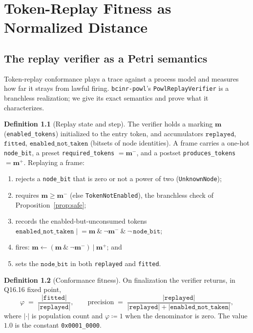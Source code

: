 \documentclass[11pt,oneside]{book}
\theoremstyle{definition}
\newtheorem{definition}{Definition}[chapter]
\theoremstyle{plain}
\theoremstyle{remark}
\newcommand{\Fitness}{\varphi}
\newcommand{\code}[1]{\texttt{#1}}
\begin{document}
\chapter{Token-Replay Fitness as Normalized Distance}
\label{ch:fitness}

\section{The replay verifier as a Petri semantics}

Token-replay conformance \cite{rozinat2008} plays a trace against a process model and measures
how far it strays from lawful firing. \code{bcinr-powl}'s \code{PowlReplayVerifier} is a
branchless realization; we give its exact semantics and prove what it characterizes.

\begin{definition}[Replay state and step]\label{def:replay}
The verifier holds a marking $\bm m$ (\code{enabled\_tokens}) initialized to the entry token,
and accumulators $\code{replayed}$, $\code{fitted}$, $\code{enabled\_not\_taken}$ (bitsets of
node identities). A frame carries a one-hot \code{node\_bit}, a preset \code{required\_tokens}
$=\bm m^{-}$, and a postset \code{produces\_tokens} $=\bm m^{+}$. Replaying a frame:
\begin{enumerate}[label=(\arabic*),leftmargin=*]
\item rejects a \code{node\_bit} that is zero or not a power of two (\code{UnknownNode});
\item requires $\bm m\ge\bm m^{-}$ (else \code{TokenNotEnabled}), the branchless check of
      Proposition~\ref{prop:safe};
\item records the enabled-but-unconsumed tokens
      $\code{enabled\_not\_taken}\mathrel{|}= \bm m\ \&\ \lnot\bm m^{-}\ \&\ \lnot\,\code{node\_bit}$;
\item fires: $\bm m\gets(\bm m\ \&\ \lnot\bm m^{-})\ |\ \bm m^{+}$; and
\item sets the $\code{node\_bit}$ in both \code{replayed} and \code{fitted}.
\end{enumerate}
\end{definition}

\begin{definition}[Conformance fitness]\label{def:fitness}
On finalization the verifier returns, in Q16.16 fixed point,
\[
\Fitness \;=\; \frac{|\code{fitted}|}{|\code{replayed}|},\qquad
\text{precision}\;=\;\frac{|\code{replayed}|}{|\code{replayed}|+|\code{enabled\_not\_taken}|},
\]
where $|\cdot|$ is population count and $\Fitness\coloneqq 1$ when the denominator is zero. The
value $1.0$ is the constant \code{0x0001\_0000}.
\end{definition}
\end{document}

